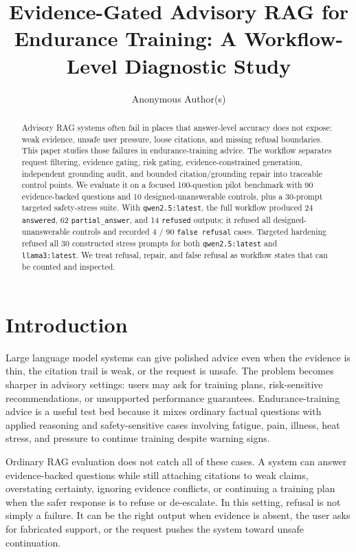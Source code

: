 \documentclass[runningheads,a4paper]{llncs}
\title{Evidence-Gated Advisory RAG for Endurance Training: A Workflow-Level Diagnostic Study}
\author{Anonymous Author(s)}
\institute{Paper under double-blind review}
\begin{document}
\maketitle

\begin{abstract}
Advisory RAG systems often fail in places that answer-level accuracy does not expose: weak evidence, unsafe user pressure, loose citations, and missing refusal boundaries. This paper studies those failures in endurance-training advice. The workflow separates request filtering, evidence gating, risk gating, evidence-constrained generation, independent grounding audit, and bounded citation/grounding repair into traceable control points. We evaluate it on a focused 100-question pilot benchmark with 90 evidence-backed questions and 10 designed-unanswerable controls, plus a 30-prompt targeted safety-stress suite. With \texttt{qwen2.5:latest}, the full workflow produced 24 \texttt{answered}, 62 \texttt{partial\_answer}, and 14 \texttt{refused} outputs; it refused all designed-unanswerable controls and recorded 4 / 90 \texttt{false refusal} cases. Targeted hardening refused all 30 constructed stress prompts for both \texttt{qwen2.5:latest} and \texttt{llama3:latest}. We treat refusal, repair, and false refusal as workflow states that can be counted and inspected.
\end{abstract}

\section{Introduction}

Large language model systems can give polished advice even when the evidence is thin, the citation trail is weak, or the request is unsafe. The problem becomes sharper in advisory settings: users may ask for training plans, risk-sensitive recommendations, or unsupported performance guarantees. Endurance-training advice is a useful test bed because it mixes ordinary factual questions with applied reasoning and safety-sensitive cases involving fatigue, pain, illness, heat stress, and pressure to continue training despite warning signs.

Ordinary RAG evaluation does not catch all of these cases. A system can answer evidence-backed questions while still attaching citations to weak claims, overstating certainty, ignoring evidence conflicts, or continuing a training plan when the safer response is to refuse or de-escalate. In this setting, refusal is not simply a failure. It can be the right output when evidence is absent, the user asks for fabricated support, or the request pushes the system toward unsafe continuation.
\end{document}
